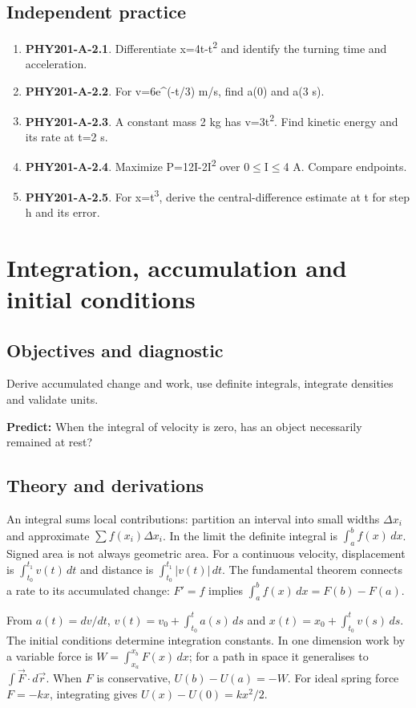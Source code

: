 \documentclass[11pt,a4paper,openany]{book}
\begin{document}
\section{Independent practice}
\begin{enumerate}
\item \textbf{PHY201-A-2.1}. Differentiate x=4t-t\textsuperscript{2} and identify the turning time and acceleration.
\item \textbf{PHY201-A-2.2}. For v=6e^(-t/3) m/s, find a(0) and a(3 s).
\item \textbf{PHY201-A-2.3}. A constant mass 2 kg has v=3t\textsuperscript{2}. Find kinetic energy and its rate at t=2 s.
\item \textbf{PHY201-A-2.4}. Maximize P=12I-2I\textsuperscript{2} over 0\ensuremath{\le}I\ensuremath{\le}4 A. Compare endpoints.
\item \textbf{PHY201-A-2.5}. For x=t\textsuperscript{3}, derive the central-difference estimate at t for step h and its error.
\end{enumerate}
\chapter{Integration, accumulation and initial conditions}
\section{Objectives and diagnostic}
Derive accumulated change and work, use definite integrals, integrate densities and validate units.

\textbf{Predict:} When the integral of velocity is zero, has an object necessarily remained at rest?
\section{Theory and derivations}
An integral sums local contributions: partition an interval into small widths $\Delta x_i$ and approximate $\sum f(x_i)\Delta x_i$. In the limit the definite integral is $\int_a^b f(x)\,dx$. Signed area is not always geometric area. For a continuous velocity, displacement is $\int_{t_0}^{t_1}v(t)\,dt$ and distance is $\int_{t_0}^{t_1}|v(t)|\,dt$. The fundamental theorem connects a rate to its accumulated change: $F'=f$ implies $\int_a^b f(x)\,dx=F(b)-F(a)$.

From $a(t)=dv/dt$, $v(t)=v_0+\int_{t_0}^t a(s)\,ds$ and $x(t)=x_0+\int_{t_0}^t v(s)\,ds$. The initial conditions determine integration constants. In one dimension work by a variable force is $W=\int_{x_a}^{x_b}F(x)\,dx$; for a path in space it generalises to $\int\vec F\cdot d\vec r$. When $F$ is conservative, $U(b)-U(a)=-W$. For ideal spring force $F=-kx$, integrating gives $U(x)-U(0)=kx^2/2$.
\end{document}
